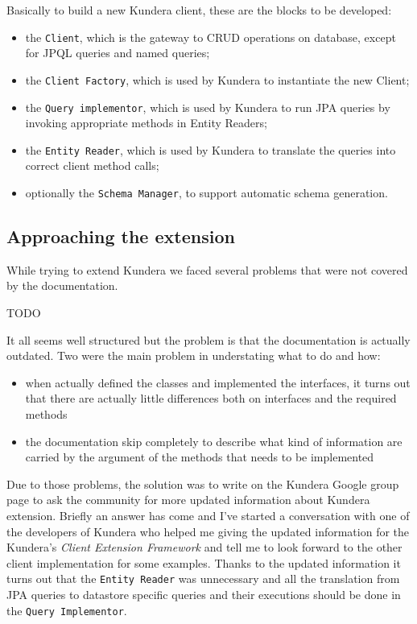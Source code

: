 \newparagraph Basically to build a new Kundera client, these are the blocks to be developed:
\begin{itemize}
\item the \texttt{Client}, which is the gateway to CRUD operations on database, except for JPQL queries and named queries;
\item the \texttt{Client Factory}, which is used by Kundera to instantiate the new Client;
\item the \texttt{Query implementor}, which is used by Kundera to run JPA queries by invoking appropriate methods in Entity Readers;
\item the \texttt{Entity Reader}, which is used by Kundera to translate the queries into correct client method calls;
\item optionally the \texttt{Schema Manager}, to support automatic schema generation.
\end{itemize}

\subsection{Approaching the extension}
While trying to extend Kundera we faced several problems that were not covered by the documentation.

\newparagraph TODO

\newparagraph It all seems well structured but the problem is that the documentation is actually outdated. 
\noindent Two were the main problem in understating what to do and how:
\begin{itemize}
\item when actually defined the classes and implemented the interfaces, it turns out that there are actually little differences both on interfaces and the required methods 
\item the documentation skip completely to describe what kind of information are carried by the argument of the methods that needs to be implemented
\end{itemize} 

\noindent Due to those problems, the solution was to write on the Kundera Google group page to ask the community for more updated information about Kundera extension.
Briefly an answer has come and I've started a conversation with one of the developers of Kundera who helped me giving the updated information for the Kundera's \textit{Client Extension Framework} and tell me to look forward to the other client implementation for some examples. 
Thanks to the updated information it turns out that the \texttt{Entity Reader} was unnecessary and all the translation from JPA queries to datastore specific queries and their executions should be done in the \texttt{Query Implementor}.  

